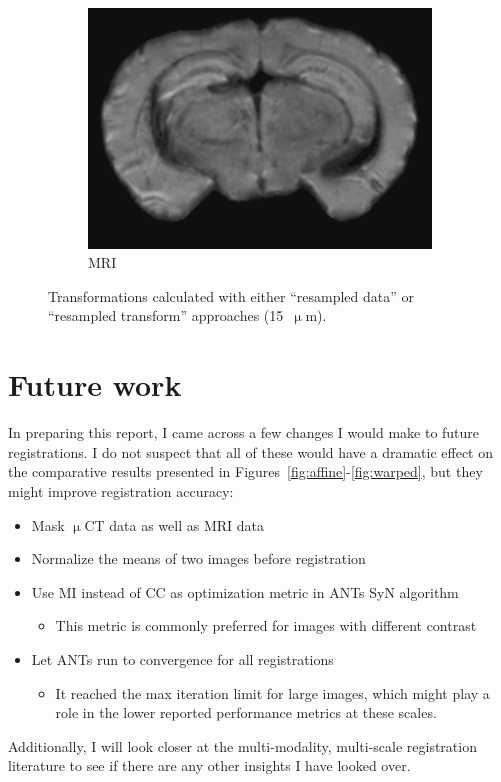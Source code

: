 \documentclass[11pt]{article}
\begin{document}
\begin{figure}[h]
\begin{subfigure}[b]{0.3\textwidth}
    \includegraphics[width=\linewidth]{figs/mri_15um_bilinear_617}
    \caption{MRI}
    \label{fig:mri15}
  \end{subfigure}
  \caption{Transformations calculated with either ``resampled data'' or
    ``resampled transform'' approaches (15~$\upmu$m).}
  \label{fig:15um}
\end{figure}


\section{Future work}
In preparing this report, I came across a few changes I would make to future
registrations. I do not suspect that all of these would have a dramatic effect
on the comparative results presented in Figures~\ref{fig:affine}-\ref{fig:warped},
but they might improve registration accuracy:
\begin{itemize}
\item Mask $\upmu$CT data as well as MRI data
\item Normalize the means of two images before registration
\item Use MI instead of CC as optimization metric in ANTs SyN algorithm
  \begin{itemize}
  \item This metric is commonly preferred for images with different contrast 
  \end{itemize}
\item Let ANTs run to convergence for all registrations
  \begin{itemize}
  \item It reached the max iteration limit for large images, which might play a
    role in the lower reported performance metrics at these scales. 
  \end{itemize}
\end{itemize}

Additionally, I will look closer at the multi-modality, multi-scale registration
literature to see if there are any other insights I have looked over. 



\end{document}

